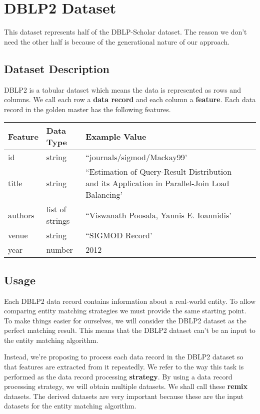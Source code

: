 \documentclass[a4paper,12pt]{article}
\begin{document}
\section{DBLP2 Dataset}
    This dataset represents half of the DBLP-Scholar dataset. The reason we
    don't need the other half is because of the generational nature of our
    approach.
\subsection{Dataset Description}
    DBLP2 is a tabular dataset which means the data is represented as rows
    and columns. We call each row a \textbf{data record} and each column a
    \textbf{feature}. Each data record in the golden master has the
    following features.
    \begin{center}
        \begin{tabular}{llll}
            \toprule
            Feature & Data Type & Example Value \\
            \midrule
            id & string & ``journals/sigmod/Mackay99' \\
            title & string & ``Estimation of Query-Result Distribution and its Application in Parallel-Join Load Balancing' \\
            authors & list of strings & ``Viswanath Poosala, Yannis E. Ioannidis' \\
            venue & string & ``SIGMOD Record' \\
            year & number & 2012 \\
            \bottomrule
        \end{tabular}
    \end{center}
\subsection{Usage}
\begin{FlushLeft}
    Each DBLP2 data record contains information about a real-world entity.
    To allow comparing entity matching strategies we must provide the same
    starting point. To make things easier for ourselves, we will consider
    the DBLP2 dataset as the perfect matching result. This means that the
    DBLP2 dataset can't be an input to the entity matching algorithm.
\end{FlushLeft}
\begin{FlushLeft}
    Instead, we're proposing to process each data record in the DBLP2 dataset
    so that features are extracted from it repeatedly. We refer to the way
    this task is performed as the data record processing \textbf{strategy}.
    By using a data record processing strategy, we will obtain multiple
    datasets. We shall call these \textbf{remix} datasets. The derived
    datasets are very important because these are the input datasets for the
    entity matching algorithm.
\end{FlushLeft}
\end{document}
